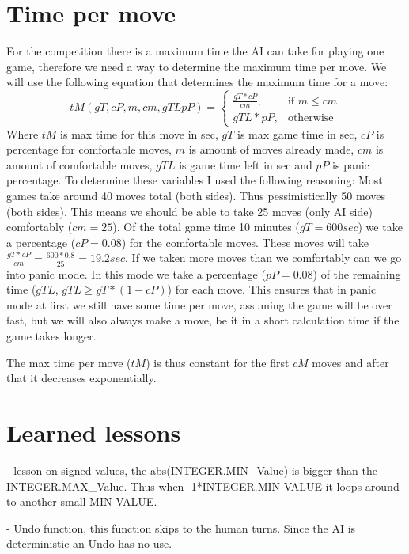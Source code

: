 \documentclass{article}
\begin{document}
\section{Time per move}
\label{sec:tpm}
For the competition there is a maximum time the AI can take for playing one game, therefore we need a way to determine the maximum time per move. We will use the following equation that determines the maximum time for a move:
\begin{equation*}
    tM(gT, cP, m, cm, gTL pP)= 
\begin{cases}
    \frac{gT*cP}{cm},& \text{if } m\leq cm\\
    gTL*pP,            & \text{otherwise}
\end{cases}
\end{equation*}
Where $tM$ is max time for this move in sec, $gT$ is max game time in sec, $cP$ is percentage for comfortable moves, $m$ is amount of moves already made, $cm$ is amount of comfortable moves, $gTL$ is game time left in sec and $pP$ is panic percentage.
To determine these variables I used the following reasoning:
Most games take around 40 moves total (both sides). Thus pessimistically 50 moves (both sides). This means we should be able to take 25 moves (only AI side) comfortably ($cm = 25$). Of the total game time  10 minutes ($gT = 600 sec$) we take a percentage ($cP = 0.08$) for the comfortable moves. These moves will take $\frac{gT*cP}{cm} = \frac{600*0.8}{25} = 19.2 sec$. If we taken more moves than we comfortably can we go into panic mode. In this mode we take a percentage ($pP = 0.08$) of the remaining time ($gTL$, $gTL \geq gT*(1-cP)$) for each move. This ensures that in panic mode at first we still have some time per move, assuming the game will be over fast, but we will also always make a move, be it in a short calculation time if the game takes longer.  

The max time per move ($tM$) is thus constant for the first $cM$ moves and after that it decreases exponentially.


\iffalse
\section{Learned lessons}
- lesson on signed values, the abs(INTEGER.MIN\_Value) is bigger than the INTEGER.MAX\_Value. Thus when -1*INTEGER.MIN-VALUE it loops around to another small MIN-VALUE.

- Undo function, this function skips to the human turns. Since the AI is deterministic an Undo has no use.
\end{document}
